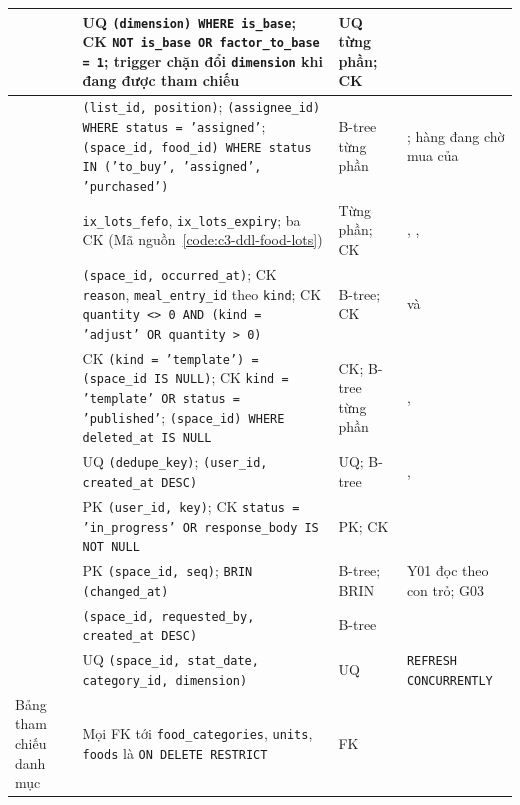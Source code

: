 {\begin{longtable}{|L{2.75cm}|L{7.3cm}|L{2.0cm}|L{\dimexpr{}\arrayrulewidth-2.75cm-7.3cm-2.0cm\relax}|}
 & UQ \texttt{(dimension) WHERE is\_base}; CK \texttt{NOT is\_base OR factor\_to\_base = 1}; trigger chặn đổi \texttt{dimension} khi đang được tham chiếu & UQ từng phần; CK & \\ \hline
{} & \texttt{(list\_id, position)}; \texttt{(assignee\_id) WHERE status = 'assigned'}; \texttt{(space\_id, food\_id) WHERE status IN ('to\_buy', 'assigned', 'purchased')} & B-tree từng phần & ; hàng đang chờ mua của \\ \hline
{} & \texttt{ix\_lots\_fefo}, \texttt{ix\_lots\_expiry}; ba CK (Mã nguồn~\ref{code:c3-ddl-food-lots}) & Từng phần; CK & , , \\ \hline
{} & \texttt{(space\_id, occurred\_at)}; CK \texttt{reason}, \texttt{meal\_entry\_id} theo \texttt{kind}; CK \texttt{quantity <> 0 AND (kind = 'adjust' OR quantity > 0)} & B-tree; CK &  và \\ \hline
{} & CK \texttt{(kind = 'template') = (space\_id IS NULL)}; CK \texttt{kind = 'template' OR status = 'published'}; \texttt{(space\_id) WHERE deleted\_at IS NULL} & CK; B-tree từng phần & , \\ \hline
{} & UQ \texttt{(dedupe\_key)}; \texttt{(user\_id, created\_at DESC)} & UQ; B-tree & , \\ \hline
{} & PK \texttt{(user\_id, key)}; CK \texttt{status = 'in\_progress' OR response\_body IS NOT NULL} & PK; CK & \\ \hline
{} & PK \texttt{(space\_id, seq)}; \texttt{BRIN (changed\_at)} & B-tree; BRIN & Y01 đọc theo con trỏ; G03\\ \hline
{} & \texttt{(space\_id, requested\_by, created\_at DESC)} & B-tree & \\ \hline
{} & UQ \texttt{(space\_id, stat\_date, category\_id, dimension)} & UQ & \texttt{REFRESH CONCURRENTLY}\\ \hline
Bảng tham chiếu danh mục & Mọi FK tới \texttt{food\_categories}, \texttt{units}, \texttt{foods} là \texttt{ON DELETE RESTRICT} & FK & \\ \hline
\end{longtable}
}


